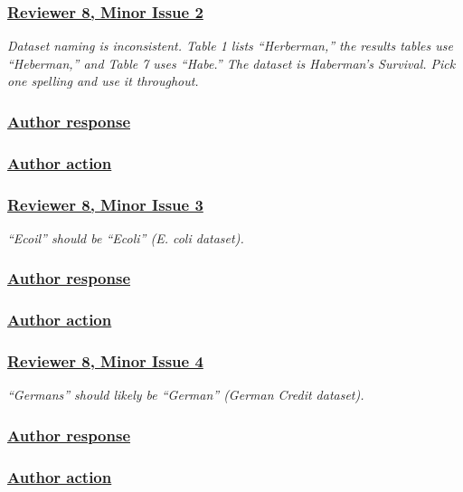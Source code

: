 \documentclass[journal,12pt, onecolumn]{IEEEtran}
\begin{document}
{\color{customgreen}
\subsubsection*{\underline{\textbf{Reviewer 8, Minor Issue 2}}}
\emph{Dataset naming is inconsistent. Table 1 lists ``Herberman,'' the results tables use ``Heberman,'' and Table 7 uses ``Habe.'' The dataset is Haberman's Survival. Pick one spelling and use it throughout.}
}


{\color{black}
\subsubsection*{\textbf{\underline{Author response}}}
}


{\color{black}
\subsubsection*{\textbf{\underline{Author action}}}
}


{\color{customgreen}
\subsubsection*{\underline{\textbf{Reviewer 8, Minor Issue 3}}}
\emph{``Ecoil'' should be ``Ecoli'' (E. coli dataset).}
}


{\color{black}
\subsubsection*{\textbf{\underline{Author response}}}
}


{\color{black}
\subsubsection*{\textbf{\underline{Author action}}}
}


{\color{customgreen}
\subsubsection*{\underline{\textbf{Reviewer 8, Minor Issue 4}}}
\emph{``Germans'' should likely be ``German'' (German Credit dataset).}
}


{\color{black}
\subsubsection*{\textbf{\underline{Author response}}}
}


{\color{black}
\subsubsection*{\textbf{\underline{Author action}}}
}
\end{document}
